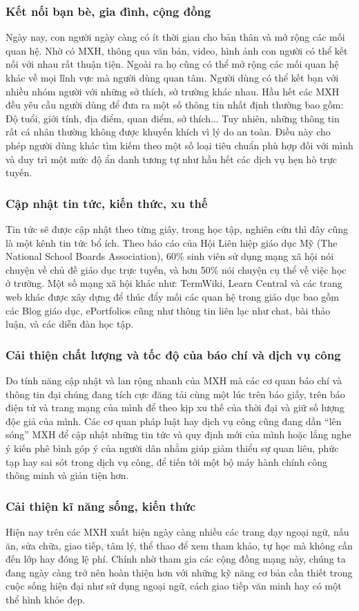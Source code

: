 		\subsubsection{Kết nối bạn bè, gia đình, cộng đồng}
		Ngày nay, con người ngày càng có ít thời gian cho bản thân và mở rộng các mối quan hệ. Nhờ có MXH, thông qua văn bản, video, hình ảnh con người có thể kết nối với nhau rất thuận tiện. Ngoài ra họ cũng có thể mở rộng các mối quan hệ khác về mọi lĩnh vực mà người dùng quan tâm. Người dùng có thể kết bạn với nhiều nhóm người với những sở thích, sở trường khác nhau. Hầu hết các MXH đều yêu cầu người dùng để đưa ra một số thông tin nhất định thường bao gồm: Độ tuổi, giới tính, địa điểm, quan điểm, sở thích... Tuy nhiên, những thông tin rất cá nhân thường không được khuyến khích vì lý do an toàn. Điều này cho phép người dùng khác tìm kiếm theo một số loại tiêu chuẩn phù hợp đối với mình và duy trì một mức độ ẩn danh tương tự như hầu hết các dịch vụ hẹn hò trực tuyến.
		\subsubsection{Cập nhật tin tức, kiến thức, xu thế}
		Tin tức sẽ được cập nhật theo từng giây, trong học tập, nghiên cứu thì đây cũng là một kênh tin tức bổ ích. Theo báo cáo của Hội Liên hiệp giáo dục Mỹ (The National School Boards Association), 60\% sinh viên sử dụng mạng xã hội nói chuyện về chủ đề giáo dục trực tuyến, và hơn 50\% nói chuyện cụ thể về việc học ở trường. Một số mạng xã hội khác như: TermWiki, Learn Central và các trang web khác được xây dựng để thúc đẩy mối các quan hệ trong giáo dục bao gồm các Blog giáo dục, ePortfolios cũng như thông tin liên lạc như chat, bài thảo luận, và các diễn đàn học tập.
		\subsubsection{Cải thiện chất lượng và tốc độ của báo chí và dịch vụ công}
		Do tính năng cập nhật và lan rộng nhanh của MXH mà các cơ quan báo chí và thông tin đại chúng đang tích cực đăng tải cùng một lúc trên báo giấy, trên báo điện tử và trang mạng của mình để theo kịp xu thế của thời đại và giữ số lượng độc giả của mình. Các cơ quan pháp luật hay dịch vụ công cũng đang dần “lên sóng” MXH để cập nhật những tin tức và quy định mới của mình hoặc lắng nghe ý kiến phê bình góp ý của người dân nhằm giúp giảm thiểu sự quan liêu, phức tạp hay sai sót trong dịch vụ công, để tiến tới một bộ máy hành chính công thông minh và giản tiện hơn.
		\subsubsection{Cải thiện kĩ năng sống, kiến thức}
		Hiện nay trên các MXH xuất hiện ngày càng nhiều các trang dạy ngoại ngữ, nấu ăn, sửa chữa, giao tiếp, tâm lý, thể thao để xem tham khảo, tự học mà không cần đến lớp hay đóng lệ phí. Chính nhờ tham gia các cộng đồng mạng này, chúng ta đang ngày càng trở nên hoàn thiện hơn với những kỹ năng cơ bản cần thiết trong cuộc sống hiện đại như sử dụng ngoại ngữ, cách giao tiếp văn minh hay có một thể hình khỏe đẹp.
